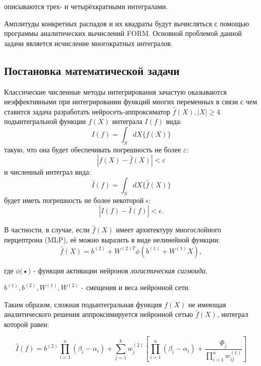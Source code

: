 \documentclass{article}
\begin{document}
описываются трех- и четырёхкратными интегралами. 

Амплитуды конкретных распадов и их квадраты будут вычисляться с помощью программы аналитических вычислений FORM. Основной проблемой данной задачи является исчисление многократных интегралов.

\subsection{Постановка математической задачи}

Классические численные методы интегрирования зачастую оказываются неэффективными при интегрировании функций многих переменных в связи с чем ставится задача разработать нейросеть-аппроксиматор $\hat{f}(X), |X| \geq 4$ подынтегральной функции $f(X)$ интеграла $I(f)$ вида: 
\begin{equation}
    I(f) = \int_{S}^{}dX\{f(X)\}
\end{equation}
такую, что она будет обеспечивать погрешность не более $\varepsilon$:
\begin{equation}
   |f(X) - \hat{f}(X)| < \varepsilon 
\end{equation}
и численный интеграл вида:
\begin{equation}
    \hat{I}(f) = \int_{S}^{}dX\{\hat{f}(X)\}
\end{equation}
будет иметь погрешность не более некоторой $\epsilon$:
\begin{equation}
    |I(f) - \hat{I}(f)| < \epsilon.
\end{equation}

В частности, в случае, если $\hat{f}(X)$ имеет архитектуру многослойного перцептрона (MLP), её можно выразить в виде нелинейной функции:
\begin{equation}
    \hat{f}(X) = b^{(2)} + W^{(2)T}\phi(b^{(1)}+W^{(1)}X),
\end{equation}

где $\phi($•$)$ - функция активации нейронов \textit{логистическая сигмоида},

$b^{(1)}, b^{(2)}, W^{(1)}, W^{(2)}$ - смещения и веса нейронной сети.

Таким образом, сложная подынтегральная функция $f(X)$ не имеющая аналитического решения аппроксимируется нейронной сетью $\hat{f}(X)$, интеграл которой равен:

\begin{equation}
    \hat{I}(f) = b^{(2)}\prod_{i=1}^{n}(\beta_i - \alpha_i) + \sum_{j=1}^{k}w_j^{(2)}[\prod_{i=1}^{n}(\beta_i - \alpha_i) + \frac{\Phi_j}{\prod_{i=1}^{n}w_{ij}^{(1)}}]
\end{equation}
\end{document}
